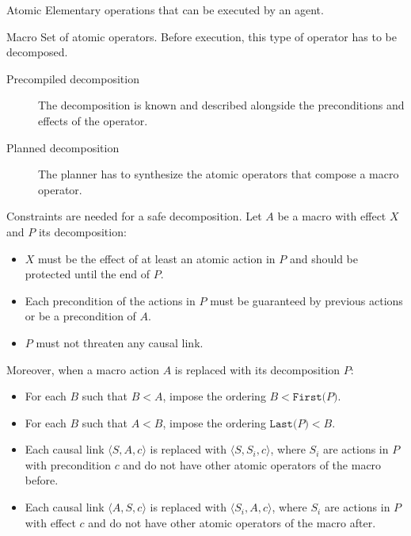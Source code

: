 \begin{descriptionlist}
    \item[Atomic] Elementary operations that can be executed by an agent.
    \item[Macro] Set of atomic operators. Before execution, this type of operator has to be decomposed.
        \begin{description}
            \item[Precompiled decomposition] 
                The decomposition is known and described alongside the preconditions and effects of the operator.
            \item[Planned decomposition] 
                The planner has to synthesize the atomic operators that compose a macro operator.
        \end{description}

        Constraints are needed for a safe decomposition.
        Let $A$ be a macro with effect $X$ and $P$ its decomposition:
        \begin{itemize}
            \item $X$ must be the effect of at least an atomic action in $P$ and should be protected until the end of $P$.
            \item Each precondition of the actions in $P$ must be guaranteed by previous actions or be a precondition of $A$.
            \item $P$ must not threaten any causal link.
        \end{itemize}

        Moreover, when a macro action $A$ is replaced with its decomposition $P$:
        \begin{itemize}
            \item For each $B$ such that $B < A$, impose the ordering $B < \texttt{First($P$)}$.
            \item For each $B$ such that $A < B$, impose the ordering $\texttt{Last($P$)} < B$.
            \item Each causal link $\langle S, A, c \rangle$ is replaced with $\langle S, S_i, c \rangle$,
                where $S_i$ are actions in $P$ with precondition $c$ and do not have other atomic operators of the macro before.
            \item Each causal link $\langle A, S, c \rangle$ is replaced with $\langle S_i, A, c \rangle$,
                where $S_i$ are actions in $P$ with effect $c$ and do not have other atomic operators of the macro after.
        \end{itemize}
        
\end{descriptionlist}

